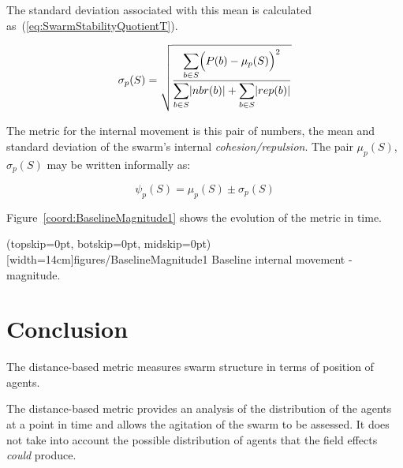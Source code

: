 \documentclass{ieeeaccess}
\begin{document}
The standard deviation associated with this mean is calculated as~(\ref{eq:SwarmStabilityQuotientT}).

\begin{equation}
\label{eq:SwarmStabilityQuotientT}
\sigma_p(S) = \sqrt{\frac{\mathlarger{\sum_{b \in S}}\Big(P(b)-\mu_p(S)\Big)^2}{\mathlarger{\sum_{b \in S}}|nbr(b)| + \mathlarger{\sum_{b \in S}}|rep(b)|}}
\end{equation}

The metric for the internal movement is this pair of numbers, the mean and standard deviation of the swarm's internal \emph{cohesion/repulsion}. The pair $\mu_p(S)$, $\sigma_p(S)$ may be written informally as: 

\begin{equation}
\label{eq:SwarmPotentialMagnitude}
\psi_p(S) = \mu_p(S)\pm \sigma_p(S)
\end{equation}

Figure~\ref{coord:BaselineMagnitude1} shows the evolution of the metric in time.

\Figure[t!](topskip=0pt, botskip=0pt, midskip=0pt)[width=14cm]{figures/BaselineMagnitude1}
{Baseline internal movement - magnitude.\label{coord:BaselineMagnitude1}}


\section{Conclusion\label{metric:MagnitudeDistanceComparison}}
The distance-based metric measures swarm structure in terms of position of agents.

The distance-based metric provides an analysis of the distribution of the agents at a point in time and allows the agitation of the swarm to be assessed. It does not take into account the possible distribution of agents that the field effects \emph{could} produce.
\end{document}
